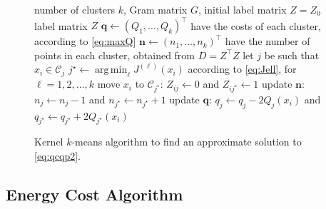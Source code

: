 \documentclass[aps,preprint,nofootinbib,floatfix]{revtex4-1}
\DeclareMathOperator*{\argmin}{arg\,min}
\newcommand\C{{\mathcal{C}}}
\begin{document}
\begin{figure}
\begin{algorithm}[H]
\vspace{.5em}
\begin{algorithmic}[1]
    \INPUT number of clusters $k$, Gram matrix $G$, initial label
    matrix $Z = Z_0$
    \OUTPUT label matrix $Z$ 
  \STATE $\bm{q} \leftarrow (Q_1, \dotsc, Q_k)^\top$ 
            have the costs of each cluster, according to \eqref{eq:maxQ}
  \STATE $\bm{n} \leftarrow (n_1,\dotsc,n_k)^\top$ 
        have the number of points in each cluster, obtained 
        from $D = Z^\top Z$
  \REPEAT
        \STATE let $j$ be such that $x_i \in \C_j$
        \STATE $j^\star \leftarrow \argmin_{\ell} J^{(\ell)}(x_i)$
            according to \eqref{eq:Jell}, for $\ell=1,2,\dots,k$
            \STATE move $x_i$ to $\C_{j^\star}$: $Z_{ij} \leftarrow 0$ and
            $Z_{ij^\star} \leftarrow 1$
            \STATE update $\bm{n}$: $n_j \leftarrow n_j - 1$ and
                    $n_{j^\star} \leftarrow n_{j^\star} + 1$
            \STATE update $\bm{q}$: $q_j \leftarrow q_j - 2Q_j(x_i)$ and
    $q_{j^\star} \leftarrow q_{j^\star} + 2Q_{j^\star}(x_i)$
        \ENDIF
    \ENDFOR
\end{algorithmic}
\caption{\label{kmeans_algo}
Kernel $k$-means algorithm 
to find an approximate solution to \eqref{eq:qcqp2}.
\hspace{\fill}
}
\end{algorithm}
\end{figure}


\subsection{Energy Cost Algorithm}
\end{document}
